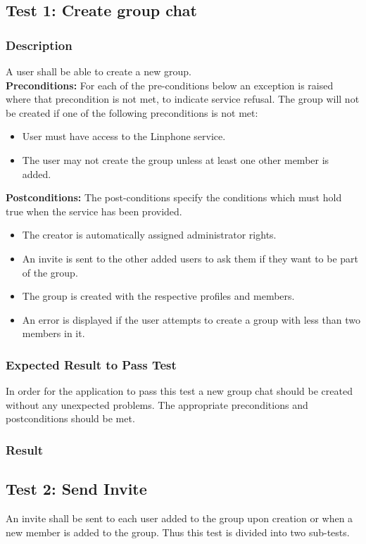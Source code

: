 \documentclass[11pt]{article}
\begin{document}
\subsection{Test 1: Create group chat}
\subsubsection{Description}
A user shall be able to create a new group.\\
\textbf{Preconditions:} For each of the pre-conditions below an exception is raised where that precondition is not met, to indicate service refusal.
The group will not be created if one of the following preconditions is not met:
\begin{itemize}
\item User must have access to the Linphone service.
\item The user may not create the group unless at least one other member is added.
\end{itemize}
\textbf{Postconditions:} The post-conditions specify the conditions which must hold true when the service has been provided.
\begin{itemize}
\item The creator is automatically assigned administrator rights.
\item An invite is sent to the other added users to ask them if they want to be part of the group.
\item The group is created with the respective profiles and members.
\item An error is displayed if the user attempts to create a group with less than two members in it.
\end{itemize}

\subsubsection{Expected Result to Pass Test}
In order for the application to pass this test a new group chat should be created without any unexpected problems. The appropriate preconditions and postconditions should be met.
\subsubsection{Result}


\subsection{Test 2: Send Invite}
An invite shall be sent to each user added to the group upon creation or when a new member is added to the group. Thus this test is divided into two sub-tests.
\end{document}
